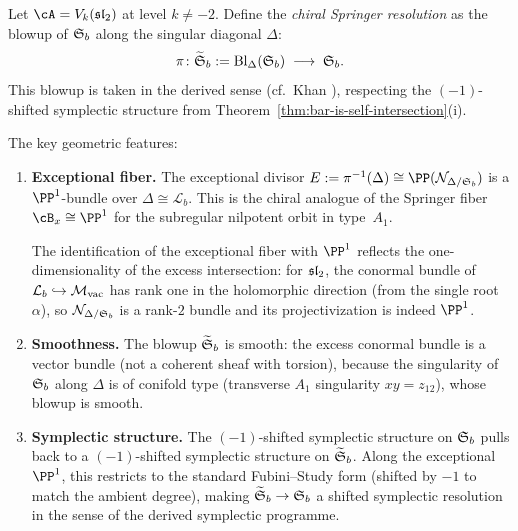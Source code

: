 \begin{construction}
\label{constr:springer-sl2}
Let $\cA = V_k(\fsl_2)$ at level $k \neq -2$. Define the
\emph{chiral Springer resolution} as the blowup of $\mathfrak{S}_b$
along the singular diagonal $\Delta$:
\[
\pi \colon \widetilde{\mathfrak{S}}_b
:= \operatorname{Bl}_\Delta(\mathfrak{S}_b)
\;\longrightarrow\;
\mathfrak{S}_b.
\]
This blowup is taken in the derived sense
\textup{(}cf.\ Khan \cite{Khan19}\textup{)}, respecting the
$(-1)$-shifted symplectic structure from
Theorem~\textup{\ref{thm:bar-is-self-intersection}(i)}.

The key geometric features:
\begin{enumerate}[label=\textup{(\alph*)}]
\item \textbf{Exceptional fiber.}
 The exceptional divisor
 $E := \pi^{-1}(\Delta) \cong \PP(\mathcal{N}_{\Delta/\Steinberg_b})$
 is a $\PP^1$-bundle over $\Delta \cong \mathcal{L}_b$. This is the
 chiral analogue of the Springer fiber $\cB_x \cong \PP^1$ for
 the subregular nilpotent orbit in type~$A_1$.

 The identification of the exceptional fiber with $\PP^1$ reflects
 the one-dimensionality of the excess intersection: for $\mathfrak{sl}_2$,
 the conormal bundle of $\mathcal{L}_b \hookrightarrow {\mathcal{M}_{\mathrm{vac}}}$ has
 rank one in the holomorphic direction (from the single root $\alpha$),
 so $\mathcal{N}_{\Delta/\mathfrak{S}_b}$ is a rank-$2$ bundle and its
 projectivization is indeed $\PP^1$.

\item \textbf{Smoothness.}
 The blowup $\widetilde{\mathfrak{S}}_b$ is smooth: the excess conormal
 bundle is a vector bundle (not a coherent sheaf with torsion), because
 the singularity of $\mathfrak{S}_b$ along $\Delta$ is of conifold type
 (transverse $A_1$ singularity $xy = z_{12}$), whose blowup is smooth.

\item \textbf{Symplectic structure.}
 The $(-1)$-shifted symplectic structure on $\mathfrak{S}_b$
 pulls back to a $(-1)$-shifted symplectic structure on
 $\widetilde{\mathfrak{S}}_b$. Along the exceptional $\PP^1$,
 this restricts to the standard Fubini--Study form (shifted by $-1$
 to match the ambient degree), making
 $\widetilde{\mathfrak{S}}_b \to \mathfrak{S}_b$ a
 shifted symplectic resolution in the sense of the derived
 symplectic programme.
\end{enumerate}
\end{construction}

